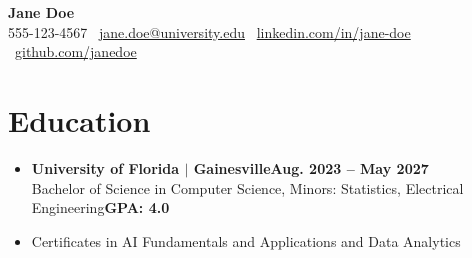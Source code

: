 \documentclass[letterpaper,10pt]{article}
\newcommand{\resumeSubHeadingListStart}{\begin{itemize}[leftmargin=0pt,label={},itemsep=2pt]}
\newcommand{\resumeSubHeadingListEnd}{\end{itemize}}
\newcommand{\resumeSubheading}[4]{\item {\textbf{#1}}\hfill{\textbf{#2}}\\
  {#3}\hfill{\textbf{#4}}}
\begin{document}
\vspace*{-0.45in}

\begin{center}
  {\fontsize{15pt}{16pt}\selectfont\bfseries Jane Doe}\\
  \vspace{2pt}
  {\normalsize 555-123-4567 \textbar\ \href{mailto:jane.doe@university.edu}{jane.doe@university.edu} \textbar\
  \href{https://www.linkedin.com/in/jane-doe/}{linkedin.com/in/jane-doe} \textbar\
  \href{https://github.com/janedoe}{github.com/janedoe}}
\end{center}

\section{\textbf{Education}}
\resumeSubHeadingListStart
  \resumeSubheading{University of Florida $|$ Gainesville}{Aug. 2023 -- May 2027}{Bachelor of Science in Computer Science, Minors: Statistics, Electrical Engineering}{GPA: 4.0}
  \item Certificates in AI Fundamentals and Applications and Data Analytics
\resumeSubHeadingListEnd

\end{document}
